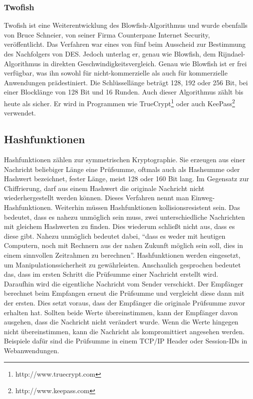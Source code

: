 \subsubsection{Twofish}
\label{twofish}
Twofish ist eine Weiterentwicklung des Blowfish-Algorithmus und wurde ebenfalls von Bruce Schneier, von seiner Firma Counterpane Internet Security, veröffentlicht.\cite[vgl.][Seite 100]{ling02}
Das Verfahren war eines von fünf beim Ausscheid zur Bestimmung des Nachfolgers von \ac{DES}\cite[vgl.][Seite 100]{ling02}.
Jedoch unterlag er, genau wie Blowfish, dem Rijndael-Algorithmus in direkten Geschwindigkeitsvergleich.
Genau wie Blowfish ist er frei verfügbar, was ihn sowohl für nicht-kommerzielle als auch für kommerzielle Anwendungen prädestiniert.
Die Schlüssellänge beträgt 128, 192 oder 256 Bit, bei einer Blocklänge von 128 Bit und 16 Runden.
Auch dieser Algorithmus zählt bis heute als sicher\cite[vgl.][Seite 100 f.]{ling02}.
Er wird in Programmen wie TrueCrypt\footnote{http://www.truecrypt.com} oder auch KeePass\footnote{http://www.keepass.com} verwendet.

\subsection{Hashfunktionen}
\label{hashfunktionen}
Hashfunktionen zählen zur symmetrischen Kryptographie.
Sie erzeugen aus einer Nachricht beliebiger Länge eine Prüfsumme, oftmals auch als Hashsumme oder Hashwert bezeichnet, fester Länge, meist 128 oder 160 Bit lang\cite[vgl.][Seite 127]{ling02}.
Im Gegensatz zur Chiffrierung, darf aus einem Hashwert die originale Nachricht nicht wiederhergestellt werden können\cite[vgl.][Seite 127]{ling02}.
Dieses Verfahren nennt man Einweg-Hashfunktionen.
Weiterhin müssen Hashfunktionen kollisionsresistent sein.
Das bedeutet, dass es nahezu unmöglich sein muss, zwei unterschiedliche Nachrichten mit gleichem Hashwerten zu finden\cite[vgl.][Seite 127]{ling02}.
Dies wiederum schließt nicht aus, dass es diese gibt.
Nahezu unmöglich bedeutet dabei, "`dass es weder mit heutigen Computern, noch mit Rechnern aus der nahen Zukunft möglich sein soll, dies in einem sinnvollen Zeitrahmen zu berechnen"'\cite[Seite 11 f.]{schwenk10}.
Hashfunktionen werden eingesetzt, um Manipulationssicherheit zu gewährleisten.
Anschaulich gesprochen bedeutet das, dass im ersten Schritt die Prüfsumme einer Nachricht erstellt wird.
Daraufhin wird die eigentliche Nachricht vom Sender verschickt.
Der Empfänger berechnet beim Empfangen erneut die Prüfsumme und vergleicht diese dann mit der ersten.
Dies setzt voraus, dass der Empfänger die originale Prüfsumme zuvor erhalten hat.
Sollten beide Werte übereinstimmen, kann der Empfänger davon ausgehen, dass die Nachricht nicht verändert wurde.
Wenn die Werte hingegen nicht übereinstimmen, kann die Nachricht als kompromittiert angesehen werden.
Beispiele dafür sind die Prüfsumme in einem TCP/IP Header oder Session-IDs in Webanwendungen\cite[vgl.][Seite 11 ff.]{schwenk10}.

